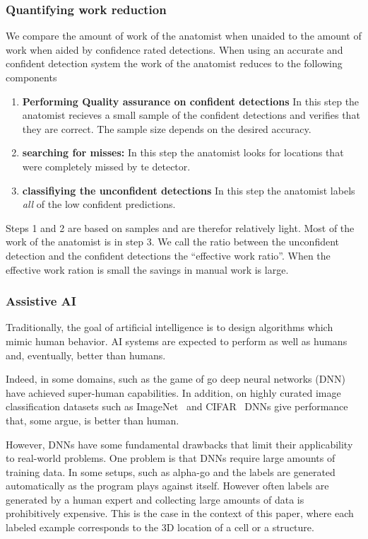 \documentclass[11pt]{article}
\begin{document}
\subsubsection{Quantifying work reduction}
We compare the amount of work of the anatomist when unaided to the
amount of work when aided by confidence rated detections.
When using an accurate and confident detection system the work of the
anatomist reduces to the following components
\begin{enumerate}
\item {\bf Performing Quality assurance on confident detections} In this step the
  anatomist recieves a small sample of the confident detections and
  verifies that they are correct. The sample size depends on the
  desired accuracy.
\item {\bf searching for misses:} In this step the anatomist looks
  for locations that were completely missed by te detector.
\item {\bf classifiying the unconfident detections} In this step
  the anatomist labels {\em all} of the low confident predictions.
  \end{enumerate}
Steps 1 and 2 are based on samples and are therefor relatively light.
Most of the work of the anatomist is in step 3. We call the ratio
between the unconfident detection and the confident detections the 
``effective work ratio''. When the effective work ration is small the
savings in manual work is large.

\iffalse
\subsubsection{Assistive AI} Traditionally, the goal of artificial
  intelligence is to design algorithms which mimic human behavior. AI
  systems are expected to perform as well as humans and, eventually,
  better than humans.

Indeed, in some domains, such as the game of go \cite{silver2017mastering} deep neural
networks (DNN)  have achieved super-human capabilities. In addition,
on highly curated image classification datasets such as ImageNet~\cite{deng2009imagenet} and
CIFAR~\cite{krizhevsky2009learning} DNNs give performance that, some argue, is better than
human. 

However, DNNs have some fundamental drawbacks that limit their
applicability to real-world problems. One problem is that DNNs
require large amounts of training data.
In some setups, such as alpha-go and the labels are generated automatically as
the program plays against itself. However often labels are generated by a
human expert and collecting large amounts of data is
prohibitively expensive. This is the case in the context of this
paper, where each labeled example corresponds to the 3D location of a
cell or a structure.
\end{document}

